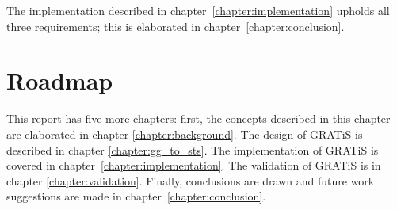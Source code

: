 The implementation described in chapter~\ref{chapter:implementation} upholds all three requirements; this is elaborated in chapter~\ref{chapter:conclusion}.

\section{Roadmap}
This report has five more chapters: first, the concepts described in this chapter are elaborated in chapter \ref{chapter:background}. The design of GRATiS is described in chapter \ref{chapter:gg_to_sts}. The implementation of GRATiS is covered in chapter~\ref{chapter:implementation}. The validation of GRATiS is in chapter \ref{chapter:validation}. Finally, conclusions are drawn and future work suggestions are made in chapter~\ref{chapter:conclusion}.
